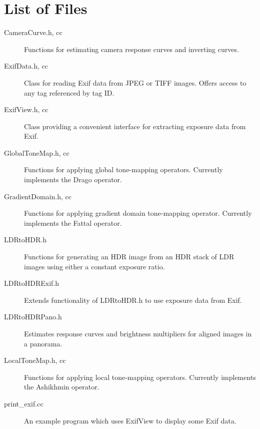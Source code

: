 \section{List of Files}
\begin{description}
\item[CameraCurve.h, cc] Functions for estimating camera response curves and inverting curves.
\item[ExifData.h, cc] Class for reading Exif data from JPEG or TIFF images. Offers access to
any tag referenced by tag ID.
\item[ExifView.h, cc] Class providing a convenient interface for extracting exposure data
from Exif.
\item[GlobalToneMap.h, cc] Functions for applying global tone-mapping operators. Currently
implements the Drago operator.
\item[GradientDomain.h, cc] Functions for applying gradient domain tone-mapping operator.
Currently implements the Fattal operator.
\item[LDRtoHDR.h] Functions for generating an HDR image from an HDR stack of LDR images
using either a constant exposure ratio.
\item[LDRtoHDRExif.h] Extends functionality of LDRtoHDR.h to use exposure data from Exif.
\item[LDRtoHDRPano.h] Estimates response curves and brightness multipliers for aligned
images in a panorama.
\item[LocalToneMap.h, cc] Functions for applying local tone-mapping operators. Currently
implements the Ashikhmin operator.
\item[print\_exif.cc] An example program which uses ExifView to display some Exif data.
\end{description}

